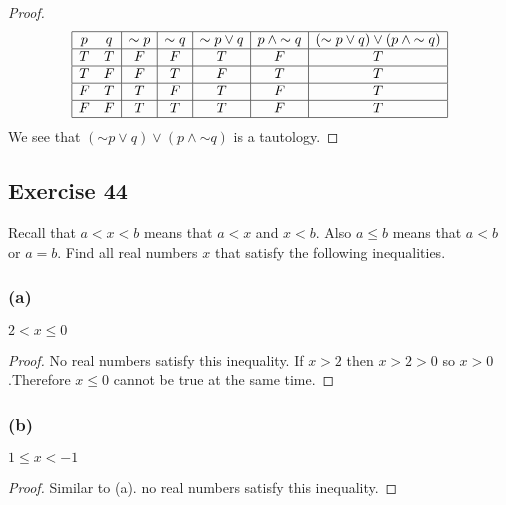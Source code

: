 \documentclass[14pt]{extarticle}
\begin{document}
\begin{proof}
    $$
        \begin{array}{|cc|c|c|c|c|c|}
            \hline
            p & q & {\sim p} & {\sim q} & {\sim p} \vee q & p \wedge {\sim q} & ({\sim p} \vee q) \vee (p \wedge {\sim q}) \\
            \hline
            T & T & F        & F        & T               & F                 & T                                          \\
            \hline
            T & F & F        & T        & F               & T                 & T                                          \\
            \hline
            F & T & T        & F        & T               & F                 & T                                          \\
            \hline
            F & F & T        & T        & T               & F                 & T                                          \\
            \hline
        \end{array}
    $$
    We see that $({\sim p} \vee q) \vee (p \wedge {\sim q})$ is a tautology.
\end{proof}

\subsection{Exercise 44}
Recall that $a < x < b$ means that $a < x$ and $x < b$. Also $a \leq b$ means that $a < b$ or $a = b$. Find all real numbers $x$ that satisfy the following inequalities.

\subsubsection{(a)}
$2 < x \leq 0$

\begin{proof}
    No real numbers satisfy this inequality. If $x > 2$ then $x > 2 > 0$ so $x > 0$.Therefore $x \leq 0$ cannot be true at the same time.
\end{proof}

\subsubsection{(b)}
$1 \leq x < -1$

\begin{proof}
    Similar to (a). no real numbers satisfy this inequality.
\end{proof}
\end{document}
